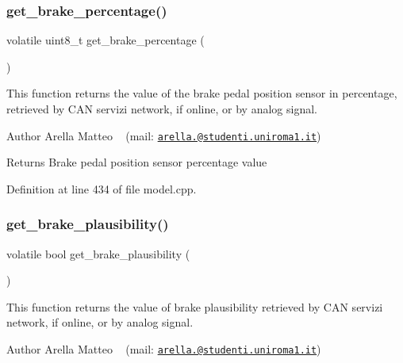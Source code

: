 \subsubsection{\texorpdfstring{get\+\_\+brake\+\_\+percentage()}{get\_brake\_percentage()}}
{\footnotesize\ttfamily volatile uint8\+\_\+t get\+\_\+brake\+\_\+percentage (\begin{DoxyParamCaption}{ }\end{DoxyParamCaption})}



This function returns the value of the brake pedal position sensor in percentage, retrieved by C\+AN servizi network, if online, or by analog signal. 

\begin{DoxyAuthor}{Author}
Arella Matteo ~\newline
 (mail\+: \href{mailto:arella.1646983@studenti.uniroma1.it}{\tt arella.@studenti.\+uniroma1.\+it})
\end{DoxyAuthor}
\begin{DoxyReturn}{Returns}
Brake pedal position sensor percentage value 
\end{DoxyReturn}


Definition at line 434 of file model.\+cpp.

\mbox{\label{group___board__model__group_gad47b702f79115e19d75b22f39b45efeb}} 
\subsubsection{\texorpdfstring{get\+\_\+brake\+\_\+plausibility()}{get\_brake\_plausibility()}}
{\footnotesize\ttfamily volatile bool get\+\_\+brake\+\_\+plausibility (\begin{DoxyParamCaption}{ }\end{DoxyParamCaption})}



This function returns the value of brake plausibility retrieved by C\+AN servizi network, if online, or by analog signal. 

\begin{DoxyAuthor}{Author}
Arella Matteo ~\newline
 (mail\+: \href{mailto:arella.1646983@studenti.uniroma1.it}{\tt arella.@studenti.\+uniroma1.\+it})
\end{DoxyAuthor}

